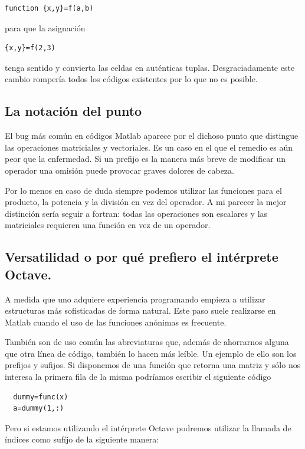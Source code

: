 \begin{lstlisting}
function {x,y}=f(a,b)
\end{lstlisting}
para que la asignación
\begin{lstlisting}
{x,y}=f(2,3)
\end{lstlisting}
tenga sentido y convierta las celdas en auténticas
tuplas. Desgraciadamente este cambio rompería todos los códigos
existentes por lo que no es posible.

\subsection{La notación del punto}

El bug más común en códigos Matlab aparece por el dichoso punto que
distingue las operaciones matriciales y vectoriales. Es un caso en el
que el remedio es aún peor que la enfermedad.  Si un prefijo es la
manera más breve de modificar un operador una omisión puede provocar
graves dolores de cabeza.

Por lo menos en caso de duda siempre podemos utilizar las funciones
para el producto, la potencia y la división en vez del operador.  A mi
parecer la mejor distinción sería seguir a fortran: todas las
operaciones son escalares y las matriciales requieren una función en
vez de un operador.

\subsection{Versatilidad o por qué prefiero el intérprete Octave.}

A medida que uno adquiere experiencia programando empieza a utilizar
estructuras más sofisticadas de forma natural.  Este paso suele
realizarse en Matlab cuando el uso de las funciones anónimas es
frecuente. 

También son de uso común las abreviaturas que, además de ahorrarnos
alguna que otra línea de código, también lo hacen más leíble. Un
ejemplo de ello son los prefijos y sufijos.  Si disponemos de una
función que retorna una matriz y sólo nos interesa la primera fila de
la misma podríamos escribir el siguiente código

\begin{lstlisting}
  dummy=func(x)
  a=dummy(1,:)
\end{lstlisting}

Pero si estamos utilizando el intérprete Octave podremos utilizar la
llamada de índices como sufíjo de la siguiente manera:

